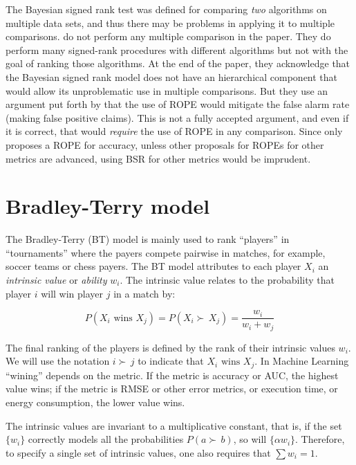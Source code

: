 \documentclass[twoside,11pt,preprint]{article}
\begin{document}
The Bayesian signed rank test was defined for comparing \emph{two}
algorithms on multiple data sets, and thus there may be problems in
applying it to multiple comparisons. \citet{benavoli2017time} do not perform
any multiple comparison in the paper. They do perform many
signed-rank procedures with different algorithms but not with the goal
of ranking those algorithms. At the end of the paper, they
acknowledge that the Bayesian signed rank model does not have an
hierarchical component that would allow its unproblematic use in
multiple comparisons. But they use an argument put forth by
\citet{kruschke2013bayesian} that the use of ROPE would mitigate the false
alarm rate (making false positive claims). This is not a fully
accepted argument, and even if it is correct, that would \emph{require} the
use of ROPE in any comparison. Since \citet{benavoli2017time} only proposes
a ROPE for accuracy, unless other proposals for ROPEs for other
metrics are advanced, using BSR for other metrics would be imprudent.

\hypertarget{bradley-terry-model}{%
\section{\texorpdfstring{Bradley-Terry model \label{sec:btmod}}{Bradley-Terry model }}\label{bradley-terry-model}}

The Bradley-Terry (BT) model \citep{bradley1952rank} is mainly used to rank
``players'' in ``tournaments'' where the payers compete pairwise in
matches, for example, soccer teams or chess payers. The BT model
attributes to each player \(X_i\) an \emph{intrinsic value} or \emph{ability}
\(w_i\). The intrinsic value relates to the probability that player \(i\)
will win player \(j\) in a match by:

\[ P(X_i \mbox{ wins } X_j) = P(X_i \succ\,X_j) = \frac{w_i}{w_i + w_j} \]

The final ranking of the players is defined by the rank of their
intrinsic values \(w_i\). We will use the notation \(i \succ\,j\) to
indicate that \(X_i \mbox{ wins } X_j\). In Machine Learning ``wining'' depends on the metric. If the metric is accuracy
or AUC, the highest value wins; if the metric is RMSE or other error
metrics, or execution time, or energy consumption, the lower value wins.

The intrinsic values are invariant to a multiplicative constant, that
is, if the set \(\{w_i\}\) correctly models all the probabilities \(P(a \succ\,b)\), so will \(\{\alpha w_i\}\). Therefore, to specify a single
set of intrinsic values, one also requires that \(\sum w_i = 1\).
\end{document}
